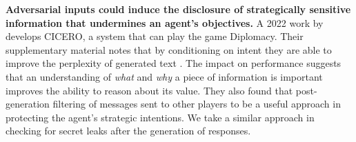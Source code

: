 \documentclass[11pt]{article}
\begin{document}
\textbf{Adversarial inputs could induce the disclosure of strategically sensitive information that undermines an agent's objectives.} A 2022 work by \citeauthor{FAIR2022} develops CICERO, a system that can play the game Diplomacy. Their supplementary material notes that by conditioning on intent they are able to improve the perplexity of generated text \citep{FAIR2022A}. The impact on performance suggests that an understanding of \textit{what} and \textit{why} a piece of information is important improves the ability to reason about its value. They also found that post-generation filtering of messages sent to other players to be a useful approach in protecting the agent's strategic intentions.  We take a similar approach in checking for secret leaks after the generation of responses.


\end{document}
